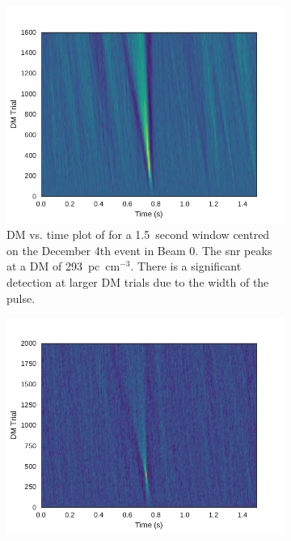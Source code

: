 \documentclass[a4paper,fleqn,usenatbib]{mnras}
\begin{document}
\begin{figure}
    \centering
    \begin{subfigure}[t]{0.5\textwidth}
        \centering\captionsetup{width=.95\linewidth}
        \includegraphics[width=1.0\textwidth]{figures/D20161204_dmtrials_buf23_Beam0.pdf}
        \caption{DM vs. time plot of for a 1.5~second window centred on the
        December 4th event in Beam 0. The \gls{snr} peaks at a DM of
        293~pc~cm$^{-3}$. There is a significant detection at larger DM trials
        due to the width of the pulse.
        }
        \label{fig:dm_time_event}
    \end{subfigure}
    \begin{subfigure}[t]{0.5\textwidth}
        \centering\captionsetup{width=.95\linewidth}
        \includegraphics[width=1.0\textwidth]{figures/B1859_dmtrials.pdf}

\end{subfigure}
\end{figure}
\end{document}
